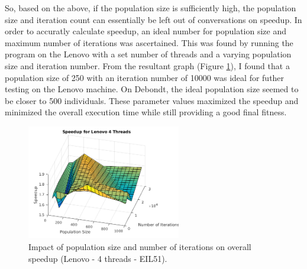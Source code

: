 \documentclass[10pt,letterpaper]{article}
\begin{document}
So, based on the above, if the population size is sufficiently high, the population size and iteration count can essentially be left out of conversations on speedup. In order to accuratly calculate speedup, an ideal number for population size and maximum number of iterations was ascertained. This was found by running the program on the Lenovo with a set number of threads and a varying population size and iteration number. From the resultant graph (Figure 
\ref{fig:popvsiter}), I found that a population size of 250 with an iteration number of 10000 was ideal for futher testing on the Lenovo machine. On Debondt, the ideal population size seemed to be closer to 500 individuals. These parameter values maximized the speedup and minimized the overall execution time while still providing a good final fitness. 

\begin{figure}
\centering
\includegraphics[width=0.6\textwidth]{../img/Lenovo_4Thread_PopvsIter.png} 
\caption{Impact of population size and number of iterations on overall speedup (Lenovo - 4 threads - EIL51).}
\label{fig:popvsiter}
\end{figure}


\end{document}
